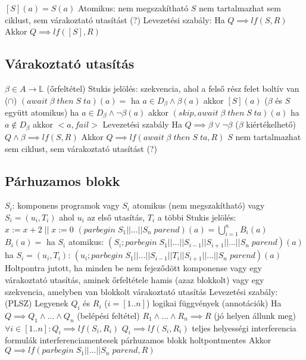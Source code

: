 \documentclass[12pt,a4paper]{article}
\begin{document}
\begin{outline}
	\1 $[S](a) = S(a)$
	\1 Atomikus: nem megszakítható
	\1 $S$ nem tartalmazhat sem ciklust, sem várakoztató utasítást (?)
	\1 Levezetési szabály:
		\2 Ha $Q \implies lf(S,R)$
		\2 Akkor $Q \implies lf([S],R)$
\end{outline}

\subsection{Várakoztató utasítás}

\begin{outline}
	\1 $\beta \in A \to \mathbb{L}$ (őrfeltétel)
	\1 Stukis jelölés: szekvencia, ahol a felső rész felet boltív van ($\cap$)
	\1 $(await \; \beta \; then \; S \; ta)(a) = $
		\2 ha $a \in D_\beta \wedge \beta(a)$ akkor $[S](a)$ \;\; ($\beta$ és $S$ együtt atomikus)
		\2 ha $a \in D_\beta \wedge \lnot \beta(a)$ akkor $(skip,await \; \beta \; then \; S \; ta)(a)$
		\2 ha $a \notin D_\beta$ akkor $<a,fail>$
	\1 Levezetési szabály
		\2 Ha
			\3 $Q \implies \beta \lor \lnot \beta$ \;\; ($\beta$ kiértékelhető)
			\3 $Q \wedge \beta \implies lf(S,R)$
		\2 Akkor $Q \implies lf(await \; \beta \; then \; S \; ta,R)$
	\1 $S$ nem tartalmazhat sem ciklust, sem várakoztató utasítást (?)
\end{outline}

\pagebreak

\subsection{Párhuzamos blokk}

\begin{outline}
	\1 $S_i$: komponens programok
		\2 vagy $S_i$ atomikus (nem megszakítható)
		\2 vagy $S_i=(u_i,T_i)$ ahol $u_i$ az első utasítás, $T_i$ a többi
	\1 Stukis jelölés: $x:=x+2 \; || \; x := 0$
	\1 $(parbegin \; S_1||...||S_n \; parend)(a)=\bigcup_{i=1}^n B_i(a)$
	\1 $B_i(a) = $
		\2 ha $S_i$ atomikus: $(S_i;parbegin \; S_1||...||S_{i-1}||S_{i+1}||...||S_n \; parend)(a)$
		\2 ha $S_i=(u_i,T_i)$: $(u_i;parbegin \; S_1||...||S_{i-1}||T_i||S_{i+1}||...||S_n \; parend)(a)$
	\1 Holtpontra jutott, ha minden be nem fejeződött komponense
		\2 vagy egy várakoztató utasítás, aminek őrfeltétele hamis (azaz blokkolt)
		\2 vagy egy szekvencia, amelyben van blokkolt várakoztató utasítás
	\1 Levezetési szabály: (PLSZ)
		\2 Legyenek $Q_i$ és $R_i$ ($i=[1..n]$) logikai függvények (annotációk)
		\2 Ha
			\3 $Q \implies Q_1 \wedge ... \wedge Q_n$ \;\; (belépési feltétel)
			\3 $R_1 \wedge ... \wedge R_n \implies R$ \;\; (jó helyen állunk meg)
			\3 $\forall i \in [1..n] : Q_i \implies lf(S_i,R_i)$
			\3 $Q_i \implies lf(S_i,R_i)$ teljes helyességi interferencia formulák interferenciamentesek
			\3 párhuzamos blokk holtpontmentes
		\2 Akkor $Q \implies lf(parbegin \; S_1||...||S_n \; parend, R)$
\end{outline}
\end{document}
